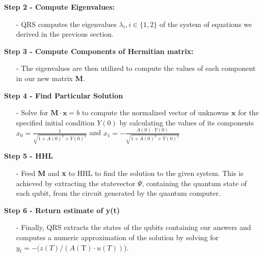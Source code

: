 \textbf{Step 2 - Compute Eigenvalues:}
\begin{itemize}
    \item[-] QRS computes the eigenvalues $\lambda_i, i \in \{1,2\}$ of the system of equations we derived in the previous section.
\end{itemize}

\textbf{Step 3 - Compute Components of Hermitian matrix:}
\begin{itemize}
    \item[-] The eigenvalues are then utilized to compute the values of each component in our new matrix \textbf{M}. 
\end{itemize}

\textbf{Step 4 - Find Particular Solution}
\begin{itemize}
    \item[-] Solve for $\textbf{M}\cdot \textbf{x} = b$ to compute the normalized vector of unknowns $\textbf{x}$ for the specified initial condition $Y(0)$ by calculating the values of its components $x_0 = \frac{1}{\sqrt{1 + A(0)^2 + Y(0)^2}}$ and $x_1 = - \frac{A(0)\cdot Y(0)}{\sqrt{1 + A(0)^2 + Y(0)^2}}$
\end{itemize}

\textbf{Step 5 - HHL}
\begin{itemize}
    \item[-] Feed \textbf{M} and \textbf{x} to HHL to find the solution to the given system. This is achieved by extracting the statevector $\Psi$, containing the quantum state of each qubit, from the circuit generated by the quantum computer.
\end{itemize}

\textbf{Step 6 - Return estimate of y(t)}
\begin{itemize}
    \item[-] Finally, QRS extracts the states of the qubits containing our answers and computes a numeric approximation of the solution by solving for $y_t = -(z(T) / ( A(\text{T}) \cdot u(T) ) $).
\end{itemize}